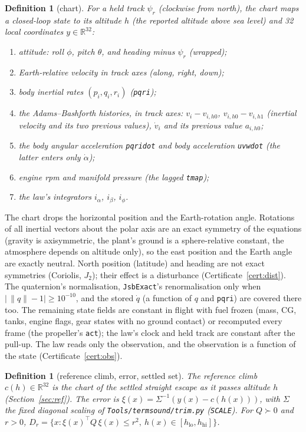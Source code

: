 \documentclass[11pt]{article}
\newtheorem{definition}[theorem]{Definition}
\newcommand{\R}{\mathbb{R}}
\begin{document}
\begin{definition}[chart]\label{def:chart}
For a held track $\psi_r$ (clockwise from north), the chart maps a closed-loop state to its altitude $h$ (the reported altitude above sea level) and 32 local coordinates $y \in \R^{32}$:
\begin{enumerate}
\item attitude: roll $\phi$, pitch $\theta$, and heading minus $\psi_r$ (wrapped);
\item Earth-relative velocity in track axes (along, right, down);
\item body inertial rates $(p_i, q_i, r_i)$ (\texttt{pqri});
\item the Adams--Bashforth histories, in track axes: $v_i - v_{i,h0}$, $v_{i,h0} - v_{i,h1}$ (inertial velocity and its two previous values), $\dot v_i$ and its previous value $a_{i,h0}$;
\item the body angular acceleration \texttt{pqridot} and body acceleration \texttt{uvwdot} (the latter enters only $\dot\alpha$);
\item engine rpm and manifold pressure (the lagged \texttt{tmap});
\item the law's integrators $i_\alpha$, $i_\beta$, $i_\phi$.
\end{enumerate}
\end{definition}

The chart drops the horizontal position and the Earth-rotation angle. Rotations of all inertial vectors about the polar axis are an exact symmetry of the equations (gravity is axisymmetric, the plant's ground is a sphere-relative constant, the atmosphere depends on altitude only), so the east position and the Earth angle are exactly neutral. North position (latitude) and heading are not exact symmetries (Coriolis, $J_2$); their effect is a disturbance (Certificate~\ref{cert:dist}). The quaternion's normalisation, \texttt{JsbExact}'s renormalisation only when $|\,\|q\| - 1| \ge 10^{-10}$, and the stored $\dot q$ (a function of $q$ and \texttt{pqri}) are covered there too. The remaining state fields are constant in flight with fuel frozen (mass, CG, tanks, engine flags, gear states with no ground contact) or recomputed every frame (the propeller's \texttt{act}); the law's clock and held track are constant after the pull-up. The law reads only the observation, and the observation is a function of the state (Certificate~\ref{cert:obs}).

\begin{definition}[reference climb, error, settled set]
The \emph{reference climb} $c(h) \in \R^{32}$ is the chart of the settled straight escape as it passes altitude $h$ (Section~\ref{sec:ref}). The error is $\xi(x) = \Sigma^{-1}(y(x) - c(h(x)))$, with $\Sigma$ the fixed diagonal scaling of \texttt{Tools/termsound/trim.py} (\texttt{SCALE}). For $Q \succ 0$ and $r > 0$, $D_r = \{x : \xi(x)^\top Q\, \xi(x) \le r^2,\ h(x) \in [h_{\mathrm{lo}}, h_{\mathrm{hi}}]\}$.
\end{definition}
\end{document}
